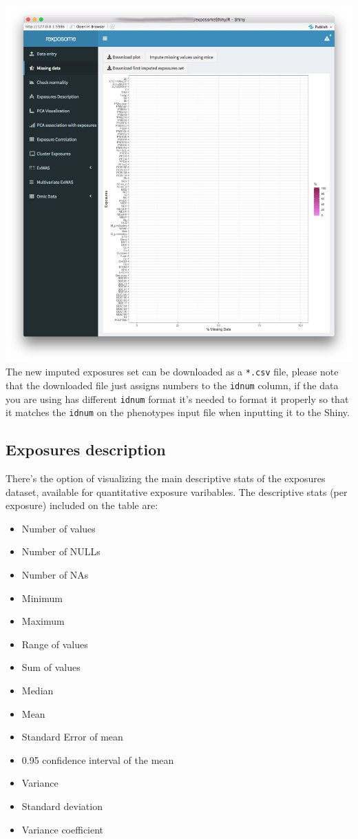 \documentclass[
]{book}
\providecommand{\tightlist}{%
  \setlength{\itemsep}{0pt}\setlength{\parskip}{0pt}}
\begin{document}
\includegraphics{images/analysis2_3.png} The new imputed exposures set can be downloaded as a \texttt{*.csv} file, please note that the downloaded file just assigns numbers to the \texttt{idnum} column, if the data you are using has different \texttt{idnum} format it's needed to format it properly so that it matches the \texttt{idnum} on the phenotypes input file when inputting it to the Shiny.

\hypertarget{exposures-description}{%
\subsection{Exposures description}\label{exposures-description}}

There's the option of visualizing the main descriptive stats of the exposures dataset, available for quantitative exposure varibables. The descriptive stats (per exposure) included on the table are:

\begin{itemize}
\tightlist
\item
  Number of values
\item
  Number of NULLs
\item
  Number of NAs
\item
  Minimum
\item
  Maximum
\item
  Range of values
\item
  Sum of values
\item
  Median
\item
  Mean
\item
  Standard Error of mean
\item
  0.95 confidence interval of the mean
\item
  Variance
\item
  Standard deviation
\item
  Variance coefficient
\end{itemize}
\end{document}

